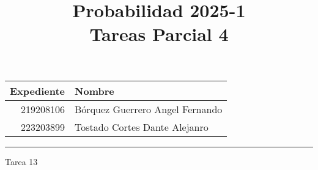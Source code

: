 \documentclass[a4paper, 12pt]{article}
\title
{
    Probabilidad 2025-1 \\
    Tareas Parcial 4
}
\begin{document}
    \maketitle

    \begin{center}
        \begin{tabular}{r|l}
            \textbf{Expediente} & \textbf{Nombre} \\ \hline
            219208106 & Bórquez Guerrero Angel Fernando \\
            223203899 & Tostado Cortes Dante Alejanro
        \end{tabular}
    \end{center}

    \rule{\linewidth}{0.3mm}



    \vspace{0.3cm}

    \begin{center}
        { \LARGE Tarea 13}
    \end{center}
\end{document}
